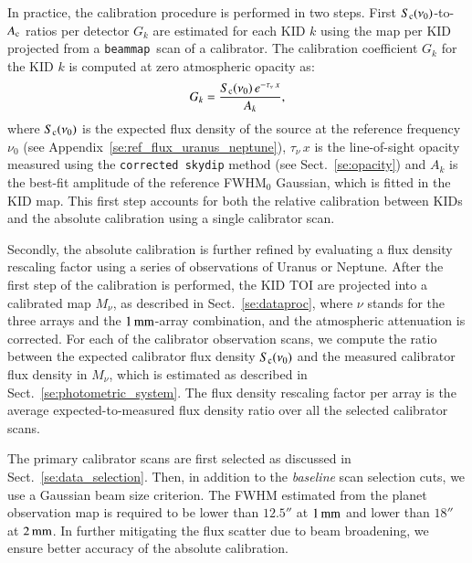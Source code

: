 \documentclass[traditionalabstract]{aa}
\newcommand{\bm}{{\tt beammap}}
\newcommand{\taunu}{\tau_{\nu}}
\newcommand{\lp}[1]{#1}
\begin{document}
{\lp In practice, the calibration procedure is performed in two steps. First
$S_{\rm{c}}(\nu_{0})$-to-$A_{\rm{c}}$ ratios per detector $G_k$
are estimated for each KID $k$ using the map per KID projected from
a \bm\ scan of a calibrator. The calibration coefficient $G_k$
for the KID $k$ is computed at zero atmospheric opacity as:
\begin{equation}
  G_k = \frac{S_{\rm{c}}(\nu_0)\, e^{-\taunu\,x}}{A_k},
  \label{eq:kid_gain}
\end{equation}
where $S_{\rm{c}}(\nu_0)$ is the expected flux density of the source at
the reference frequency $\nu_0$ (see
Appendix~\ref{se:ref_flux_uranus_neptune}), $\taunu\, x$ is the
line-of-sight opacity measured using the {\tt corrected skydip} method
(see Sect.~\ref{se:opacity}) and $A_k$ is the best-fit
amplitude of the reference FWHM$_0$ Gaussian, which is fitted in the
KID map. %
This first step accounts for both the relative calibration between KIDs and the absolute
calibration using a single calibrator scan.

Secondly, the absolute calibration is further refined by evaluating a
flux density rescaling factor using a series of observations of
Uranus or Neptune. After the first step of the calibration is
performed, the KID TOI are projected into a calibrated map $M_\nu$, as
described in Sect.~\ref{se:dataproc}, where $\nu$ stands for the three
arrays and the $1\,\rm{mm}$-array combination, and the atmospheric attenuation
is corrected. For each of the calibrator observation scans, we
compute the ratio between the expected calibrator flux density
$S_{\rm{c}}(\nu_{0})$ and the measured calibrator flux density in $M_\nu$, which
is estimated as described in Sect.~\ref{se:photometric_system}. The
flux density rescaling factor per array is the average
expected-to-measured flux density ratio over all the selected calibrator scans.} 

The primary calibrator scans are first selected as discussed in
Sect.~\ref{se:data_selection}. Then, in addition to
the \emph{baseline} scan selection cuts, we use a Gaussian beam size
criterion. The FWHM estimated from the planet
observation map is required to be lower than $12.5''$ at $1\,\rm{mm}$ and lower
than $18''$ at $2\,\rm{mm}$. In further mitigating the flux scatter
due to beam broadening, we ensure better accuracy of the absolute
calibration.



\end{document}
